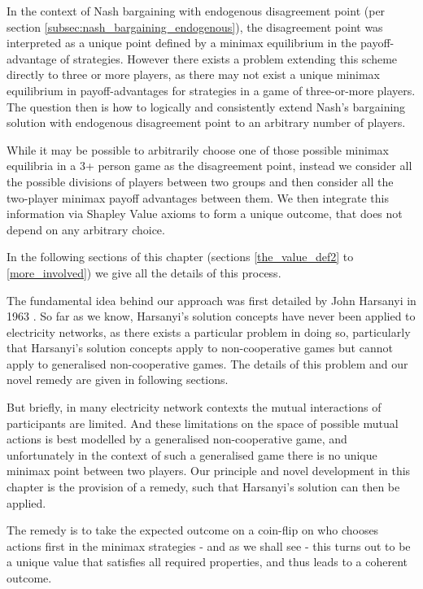 In the context of Nash bargaining with endogenous disagreement point (per section \ref{subsec:nash_bargaining_endogenous}), the disagreement point was interpreted as a unique point defined by a minimax equilibrium in the payoff-advantage of strategies.
However there exists a problem extending this scheme directly to three or more players, as there may not exist a unique minimax equilibrium in payoff-advantages for strategies in a game of three-or-more players.
The question then is how to logically and consistently extend Nash's bargaining solution with endogenous disagreement point to an arbitrary number of players.

While it may be possible to arbitrarily choose one of those possible minimax equilibria in a 3+ person game as the disagreement point, 
instead we consider all the possible divisions of players between two groups and then consider all the two-player minimax payoff advantages between them. We then integrate this information via Shapley Value axioms to form a unique outcome, that does not depend on any arbitrary choice.

In the following sections of this chapter (sections \ref{the_value_def2} to \ref{more_involved}) we give all the details of this process.%

The fundamental idea behind our approach was first detailed by John Harsanyi in 1963 \cite{values3}.
So far as we know, Harsanyi's solution concepts have never been applied to electricity networks, as there exists a particular problem in doing so, particularly that Harsanyi's solution concepts apply to non-cooperative games but cannot apply to generalised non-cooperative games.
The details of this problem and our novel remedy are given in following sections.

But briefly, in many electricity network contexts the mutual interactions of participants are limited.
And these limitations on the space of possible mutual actions is best modelled by a generalised non-cooperative game, and unfortunately in the context of such a generalised game there is no unique minimax point between two players.
Our principle and novel development in this chapter is the provision of a remedy, such that Harsanyi's solution can then be applied.

The remedy is to take the expected outcome on a coin-flip on who chooses actions first in the minimax strategies - and as we shall see - this turns out to be a unique value that satisfies all required properties, and thus leads to a coherent outcome.

